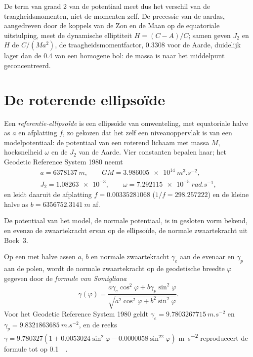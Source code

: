 De term van graad 2 van de potentiaal meet dus het verschil van de
traagheidsmomenten, niet de momenten zelf. De precessie van de aardas, aangedreven door de
koppels van de Zon en de Maan op de equatoriale uitstulping,
meet de dynamische elliptiteit $H = (C - A)/C$; samen geven $J_2$ en $H$ de
$C/(Ma^2)$, de traagheidsmomentfactor, \num{0.3308} voor de Aarde,
duidelijk lager dan de \num{0.4} van een homogene bol: de massa is naar het
middelpunt geconcentreerd.

\section{De roterende ellipsoïde}

\begin{definition}\label{def:b3:gravity-geodesy:ellipsoid}
Een \emph{referentie-ellipsoïde} is een ellipsoïde van
omwenteling, met equatoriale halve as $a$ en afplatting $f$, zo gekozen dat het
zelf een niveauoppervlak is van een modelpotentiaal: de potentiaal van een roterend
lichaam met massa $M$, hoeksnelheid $\omega$ en de 
$J_2$ van de Aarde. Vier constanten bepalen haar; het Geodetic Reference
System 1980 neemt
\begin{gather*}
  a = \qty{6378137}{m},\qquad GM = \qty{3.986005e14}{m^3.s^{-2}},\\
  J_2 = \num{1.08263e-3},\qquad \omega = \qty{7.292115e-5}{rad.s^{-1}},
\end{gather*}
en leidt daaruit de afplatting $f = \num{0.00335281068}$
($1/f = \num{298.257222}$) en de kleine halve as
$b = \qty{6356752.3141}{m}$ af.
\end{definition}

De potentiaal van het model, de normale potentiaal, is in gesloten vorm bekend, en
evenzo de zwaartekracht ervan op de ellipsoïde, de normale zwaartekracht uit Boek~3.

\begin{proposition}\label{prop:b3:gravity-geodesy:somigliana}
Op een  met halve assen $a$, $b$ en normale zwaartekracht
$\gamma_e$ aan de evenaar en $\gamma_p$ aan de polen, wordt de normale zwaartekracht op de
geodetische breedte $\varphi$ gegeven door de \emph{formule
van Somigliana}
\[
  \gamma(\varphi) = \frac{a\gamma_e\cos^2\varphi + b\gamma_p\sin^2\varphi}
  {\sqrt{a^2\cos^2\varphi + b^2\sin^2\varphi}} .
\]
Voor het Geodetic Reference System 1980 geldt $\gamma_e = \qty{9.7803267715}{m.s^{-2}}$
en $\gamma_p = \qty{9.8321863685}{m.s^{-2}}$, en de reeks
$\gamma = 9.780327(1 + 0.0053024\sin^2\varphi - 0.0000058\sin^22\varphi)$
\unit{m.s^{-2}} reproduceert de formule tot op \qty{0.1}{\milli\gal}.
\end{proposition}
\admitted

